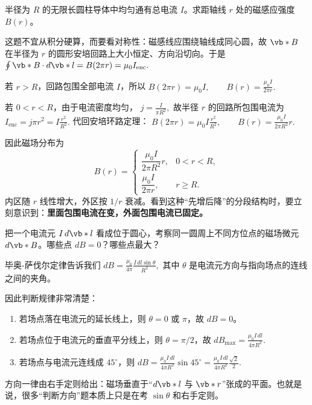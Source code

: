 \documentclass[lang=cn,11pt]{elegantbook}
\begin{document}
\begin{exercise}[无限长均匀载流圆柱体的磁场分布]
半径为 \(R\) 的无限长圆柱导体中均匀通有总电流 \(I\)。求距轴线 \(r\) 处的磁感应强度 \(B(r)\)。
\end{exercise}

\begin{solution}
这题不宜从积分硬算，而要看对称性：磁感线应围绕轴线成同心圆，故 \(\vb*{B}\) 在半径为 \(r\) 的圆形安培回路上大小恒定、方向沿切向。于是
 \(\oint \vb*{B}\cdot d\vb*{l}=B(2\pi r)=\mu_0I_{\mathrm{enc}}.\) 

若 \(r>R\)，回路包围全部电流 \(I\)，所以
 \(B(2\pi r)=\mu_0I, \qquad B(r)=\frac{\mu_0I}{2\pi r}.\) 

若 \(0<r<R\)，由于电流密度均匀，
 \(j=\frac{I}{\pi R^2},\) 
故半径 \(r\) 的回路所包围电流为
 \(I_{\mathrm{enc}}=j\pi r^2=I\frac{r^2}{R^2}.\) 
代回安培环路定理：
 \(B(2\pi r)=\mu_0I\frac{r^2}{R^2}, \qquad B(r)=\frac{\mu_0I}{2\pi R^2}r.\) 

因此磁场分布为
\[
B(r)=
\begin{cases}
\dfrac{\mu_0I}{2\pi R^2}r, & 0<r<R,\\[6pt]
\dfrac{\mu_0I}{2\pi r}, & r\ge R.
\end{cases}
\]
内区随 \(r\) 线性增大，外区按 \(1/r\) 衰减。看到这种“先增后降”的分段结构时，要立刻意识到：\textbf{里面包围电流在变，外面包围电流已固定。}
\end{solution}

\begin{exercise}[电流元在不同方位点产生的磁场方向与大小]
把一个电流元 \(I\,d\vb*{l}\) 看成位于圆心，考察同一圆周上不同方位点的磁场微元 \(d\vb*{B}\)。哪些点 \(dB=0\)？哪些点最大？
\end{exercise}

\begin{solution}
毕奥-萨伐尔定律告诉我们
 \(dB=\frac{\mu_0}{4\pi}\frac{I\,dl\sin\theta}{R^2},\) 
其中 \(\theta\) 是电流元方向与指向场点的连线之间的夹角。

因此判断规律非常清楚：
\begin{enumerate}
 \item 若场点落在电流元的延长线上，则 \(\theta=0\) 或 \(\pi\)，故 \(dB=0\)。
 \item 若场点位于电流元的垂直平分线上，则 \(\theta=\pi/2\)，故
 \(dB_{\max}=\frac{\mu_0 I\,dl}{4\pi R^2}.\) 
 \item 若场点与电流元连线成 \(45^\circ\)，则
 \(dB=\frac{\mu_0 I\,dl}{4\pi R^2}\sin45^\circ =\frac{\mu_0 I\,dl}{4\pi R^2}\frac{\sqrt2}{2}.\) 
\end{enumerate}
方向一律由右手定则给出：磁场垂直于“\(d\vb*{l}\) 与 \(\vb*{r}\)”张成的平面。也就是说，很多“判断方向”题本质上只是在考 \(\sin\theta\) 和右手定则。
\end{solution}
\end{document}
